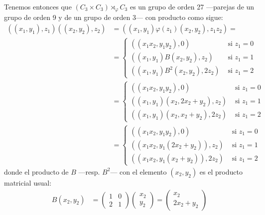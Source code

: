 \documentclass[a4paper, 11pt]{article}
\begin{document}
\begin{solucion}
      Tenemos entonces que $(C_3 \times C_3) \rtimes_{\varphi} C_3$ es un grupo de orden 27 ---parejas de un grupo de orden 9 y de un grupo de orden 3--- con producto como sigue:
      \begin{align*}
          ((x_1,y_1),z_1)((x_2,y_2),z_2) &= ((x_1,y_1)\varphi(z_1)(x_2,y_2),z_1 z_2) =\\
          &= \begin{cases}
            ((x_1 x_2,y_1 y_2),0) &\textrm{ si } z_1=0 \\
            ((x_1,y_1)B(x_2,y_2),z_2) &\textrm{ si } z_1=1 \\
            ((x_1,y_1)B^2(x_2,y_2),2z_2) &\textrm{ si } z_1=2
        \end{cases}\\
        &= \begin{cases}
          ((x_1 x_2,y_1 y_2),0) &\textrm{ si } z_1=0 \\
          ((x_1,y_1)(x_2,2x_2+y_2),z_2) &\textrm{ si } z_1=1 \\
          ((x_1,y_1)(x_2,x_2+y_2),2z_2) &\textrm{ si } z_1=2
        \end{cases}\\
        &= \begin{cases}
          ((x_1 x_2,y_1 y_2),0) &\textrm{ si } z_1=0 \\
          ((x_1 x_2,y_1(2x_2+y_2)),z_2) &\textrm{ si } z_1=1 \\
          ((x_1 x_2,y_1(x_2+y_2)),2z_2) &\textrm{ si } z_1=2
        \end{cases}
    \end{align*}
    donde el producto de $B$ ---resp. $B^2$--- con el elemento $(x_2,y_2)$ es el producto matricial usual:
    \begin{align*}
        B(x_2,y_2) &= \left(
            \begin{array}{cc}
                1 & 0 \\
                2 & 1
            \end{array}
            \right) \left(
            \begin{array}{c}
                x_2 \\
                y_2
            \end{array}
            \right) = \left(
            \begin{array}{c}
                x_2 \\
                2x_2+y_2
            \end{array}
            \right) \\

\end{align*}
\end{solucion}
\end{document}
